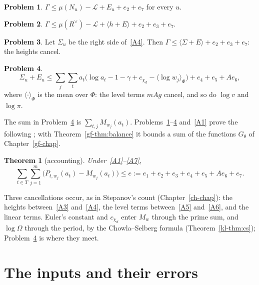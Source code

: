 \documentclass[reqno]{amsart}
\newcounter{chap}
\theoremstyle{definition}
\newtheorem{problem}{Problem}[section]
\theoremstyle{plain}
\newtheorem{theorem}{Theorem}[section]
\newcommand{\Lc}{\mathcal{L}}
\begin{document}
\begin{problem}\label{pr:A127}
\(\Gamma \le \mu(N_u) - \Lc + E_u + e_2 + e_7\) for every \(u\).
\end{problem}

\begin{problem}\label{pr:A3}
\(\Gamma \le \mu(R^\vee) - \Lc + \langle h + E \rangle + e_2 + e_3 + e_7\).
\end{problem}

\begin{problem}\label{pr:heights}
Let \(\Sigma_u\) be the right side of~\eqref{A4}.  Then \(\Gamma \le \langle \Sigma + E \rangle + e_2 + e_3 + e_7\): the heights cancel.
\end{problem}

\begin{problem}\label{pr:levels}
\[
  \Sigma_u + E_u \le \sum_{j}\sum_t a_t\bigl(\log a_t - 1 - \gamma + c_{\chi_d} - \langle\log w_j\rangle_\Phi\bigr) + e_4 + e_5 + Ae_6 ,
\]
where \(\langle\cdot\rangle_\Phi\) is the mean over \(\Phi\): the level terms \(mAg\) cancel, and so do \(\log v\) and \(\log\pi\).
\end{problem}

The sum in Problem~\ref{pr:levels} is \(\sum_{t,j} M_{w_j}(a_t)\).  Problems~\ref{pr:A127}--\ref{pr:levels} and~\eqref{A1} prove the following \cite[Prop.~3.1]{Adr}; with Theorem~\ref{gf-thm:balance} it bounds a sum of the functions \(G_\theta\) of Chapter~\ref{gf-chap}.

\begin{theorem}[accounting]\label{thm:acct}
Under~\eqref{A1}--\eqref{A7},
\[
  \sum_{t \in T}\sum_{j=1}^m \bigl( P_{t,w_j}(a_t) - M_{w_j}(a_t) \bigr) \le e := e_1 + e_2 + e_3 + e_4 + e_5 + Ae_6 + e_7 .
\]
\end{theorem}

Three cancellations occur, as in Stepanov's count (Chapter~\ref{ch-chap}): the heights between~\eqref{A3} and~\eqref{A4}, the level terms between~\eqref{A5} and~\eqref{A6}, and the linear terms.  Euler's constant and \(c_{\chi_d}\) enter \(M_w\) through the prime sum, and \(\log\Omega\) through the period, by the Chowla--Selberg formula (Theorem~\ref{kl-thm:cs}); Problem~\ref{pr:levels} is where they meet.

\section{The inputs and their errors}\label{sec:inputs}
\end{document}
